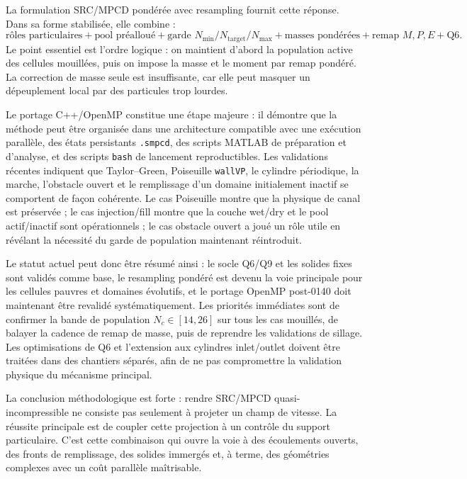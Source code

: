 \documentclass[11pt,a4paper]{article}
\begin{document}
La formulation SRC/MPCD pondérée avec resampling fournit cette réponse. Dans sa forme stabilisée, elle combine :
\begin{equation}
  \text{rôles particulaires}
  + \text{pool préalloué}
  + \text{garde }N_{\min}/N_{\mathrm{target}}/N_{\max}
  + \text{masses pondérées}
  + \text{remap }M,P,E
  + \text{Q6}.
\end{equation}
Le point essentiel est l'ordre logique : on maintient d'abord la population active des cellules mouillées, puis on impose la masse et le moment par remap pondéré. La correction de masse seule est insuffisante, car elle peut masquer un dépeuplement local par des particules trop lourdes.

Le portage C++/OpenMP constitue une étape majeure : il démontre que la méthode peut être organisée dans une architecture compatible avec une exécution parallèle, des états persistants \texttt{.smpcd}, des scripts MATLAB de préparation et d'analyse, et des scripts \texttt{bash} de lancement reproductibles. Les validations récentes indiquent que Taylor--Green, Poiseuille \texttt{wallVP}, le cylindre périodique, la marche, l'obstacle ouvert et le remplissage d'un domaine initialement inactif se comportent de façon cohérente. Le cas Poiseuille montre que la physique de canal est préservée ; le cas injection/fill montre que la couche wet/dry et le pool actif/inactif sont opérationnels ; le cas obstacle ouvert a joué un rôle utile en révélant la nécessité du garde de population maintenant réintroduit.

Le statut actuel peut donc être résumé ainsi : le socle Q6/Q9 et les solides fixes sont validés comme base, le resampling pondéré est devenu la voie principale pour les cellules pauvres et domaines évolutifs, et le portage OpenMP post-0140 doit maintenant être revalidé systématiquement. Les priorités immédiates sont de confirmer la bande de population $N_c\in[14,26]$ sur tous les cas mouillés, de balayer la cadence de remap de masse, puis de reprendre les validations de sillage. Les optimisations de Q6 et l'extension aux cylindres inlet/outlet doivent être traitées dans des chantiers séparés, afin de ne pas compromettre la validation physique du mécanisme principal.

La conclusion méthodologique est forte : rendre SRC/MPCD quasi-incompressible ne consiste pas seulement à projeter un champ de vitesse. La réussite principale est de coupler cette projection à un contrôle du support particulaire. C'est cette combinaison qui ouvre la voie à des écoulements ouverts, des fronts de remplissage, des solides immergés et, à terme, des géométries complexes avec un coût parallèle maîtrisable.
\end{document}

